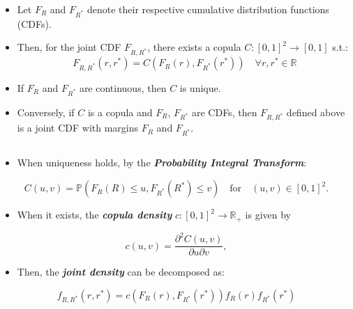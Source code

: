 \documentclass[
  letterpaper,
  DIV=11,
  numbers=noendperiod]{scrartcl}
\providecommand{\tightlist}{%
  \setlength{\itemsep}{0pt}\setlength{\parskip}{0pt}}\usepackage{longtable,booktabs,array}
\begin{document}
\begin{itemize}
\tightlist
\item
  Let \(F_R\) and \(F_{R^*}\) denote their respective cumulative
  distribution functions (CDFs).
\end{itemize}

\begin{itemize}
\item
  Then, for the joint CDF \(F_{R,R^*}\), there exists a copula
  \(C: [0,1]^2 \to [0,1]\) s.t.:
  \[F_{R,R^*}(r,r^*) = C(F_R(r), F_{R^*}(r^*)) \quad \forall r,r^* \in \mathbb{R}\]
\item
  If \(F_R\) and \(F_{R^*}\) are continuous, then \(C\) is unique.
\end{itemize}

\begin{itemize}
\tightlist
\item
  Conversely, if \(C\) is a copula and \(F_R\), \(F_{R^*}\) are CDFs,
  then \(F_{R,R^*}\) defined above is a joint CDF with margins \(F_R\)
  and \(F_{R^*}\).
\end{itemize}

\subsection{}\label{section}

\begin{itemize}
\tightlist
\item
  When uniqueness holds, by the \textbf{\emph{Probability Integral
  Transform}}:
\end{itemize}

\[
C(u,v) = \mathbb P( F_R(R) \leq u, F_{R^*}(R^*) \leq v) 
\quad \text{for} \quad
(u,v)\in[0,1]^2
.
\]

\begin{itemize}
\tightlist
\item
  When it exists, the \textbf{\emph{copula density}}
  \(c:[0,1]^2\to\mathbb R_+\) is given by
\end{itemize}

\[
   c(u,v) = \frac{\partial^2 C(u,v)}{\partial u \partial v},
\]

\begin{itemize}
\tightlist
\item
  Then, the \textbf{\emph{joint density}} can be decomposed as:
\end{itemize}

\[
f_{R,R^*}(r,r^*) = c(F_R(r), F_{R^*}(r^*)) f_R(r)f_{R^*}(r^*)
\]
\end{document}
